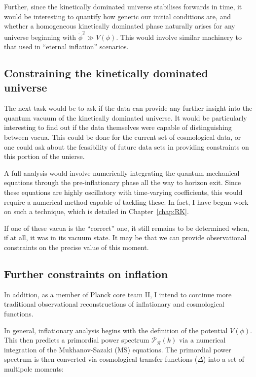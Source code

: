 Further, since the kinetically dominated universe stabilises forwards in time, it would be interesting to quantify how generic our initial conditions are, and whether a homogeneous kinetically dominated phase naturally arises for any universe beginning with $\dot{\phi}^2\gg V(\phi)$. This would involve similar machinery to that used in ``eternal inflation'' scenarios.


\subsection*{Constraining the kinetically dominated universe}

The next task would be to ask if the data can provide any further insight into the quantum vacuum of the kinetically dominated universe. It would be particularly interesting to find out if the data themselves were capable of distinguishing between vacua. This could be done for the current set of cosmological data, or one could ask about the feasibility of future data sets in providing constraints on this portion of the unierse.

A full analysis would involve numerically integrating the quantum mechanical equations through the pre-inflationary phase all the way to horizon exit. Since these equations are highly oscillatory with time-varying coefficients, this would require a numerical method capable of tackling these. In fact, I have begun work on such a technique, which is detailed in Chapter~\ref{chap:RK}.

If one of these vacua is the ``correct'' one, it still remains to be determined when, if at all, it was in its vacuum state. It may be that we can provide observational constraints on the precise value of this moment.

\subsection*{Further constraints on inflation}
In addition, as a member of Planck core team II, I intend to continue more traditional observational reconstructions of inflationary and cosmological functions.

In general, inflationary analysis begins with the definition of the potential $V(\phi)$. This then predicts a primordial power spectrum $\mathcal{P}_\mathcal{R}(k)$ via a numerical integration of the Mukhanov-Sazaki (MS) equations. The primordial power spectrum is then converted via cosmological transfer functions ($\Delta$) into a set of multipole moments:

